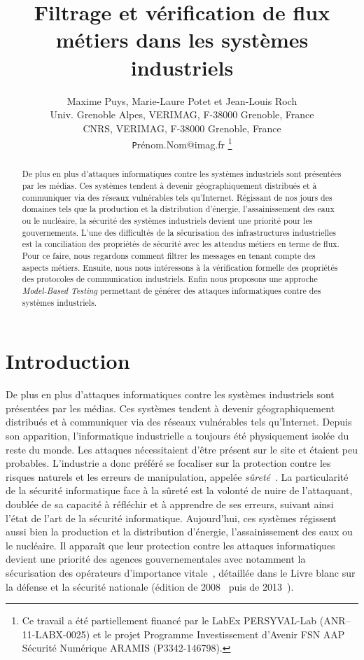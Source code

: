 \documentclass{article}
\title{Filtrage et vérification de flux métiers dans les systèmes industriels}
\author{
    Maxime Puys, Marie-Laure Potet et Jean-Louis Roch\\
    Univ. Grenoble Alpes, VERIMAG, F-38000 Grenoble, France\\
    CNRS, VERIMAG, F-38000 Grenoble, France\\
    {\texttt Prénom.Nom@imag.fr}
    \thanks{Ce travail a été partiellement financé par le LabEx PERSYVAL-Lab
    (ANR–11-LABX-0025) et le projet Programme Investissement d’Avenir FSN AAP
    Sécurité Numérique \no 3 ARAMIS (P3342-146798).}
}
\date{}
\begin{document}
\maketitle

\begin{abstract}
    De plus en plus d’attaques informatiques contre les systèmes industriels
    sont présentées par les médias.
    Ces systèmes tendent à devenir géographiquement distribués et à communiquer
    via des réseaux vulnérables tels qu’Internet.
    Régissant de nos jours des domaines tels que la production et la
    distribution d'énergie, l'assainissement des eaux ou le nucléaire, la
    sécurité des systèmes industriels devient une priorité pour les gouvernements.
    L'une des difficultés de la sécurisation des infrastructures industrielles est
    la conciliation des propriétés de sécurité avec les attendus métiers en
    terme de flux.
    Pour ce faire, nous regardons comment filtrer les messages en tenant compte
    des aspects métiers.
    Ensuite, nous nous intéressons à la vérification formelle des propriétés
    des protocoles de communication industriels.
    Enfin nous proposons une approche {\em Model-Based Testing} permettant de
    générer des attaques informatiques contre des systèmes industriels.
\end{abstract}

\section{Introduction}

De plus en plus d'attaques informatiques contre les systèmes industriels sont
présentées par les médias.
Ces systèmes tendent à devenir géographiquement distribués et à communiquer via
des réseaux vulnérables tels qu'Internet.
Depuis son apparition, l'informatique industrielle a toujours été physiquement
isolée du reste du monde.
Les attaques nécessitaient d'être présent sur le site et étaient peu probables.
L'industrie a donc préféré se focaliser sur la protection contre les risques
naturels et les erreurs de manipulation, appelée {\em sûreté}~\cite{Pie10,PS09,
IAEA96}.
La particularité de la sécurité informatique face à la sûreté est la volonté
de nuire de l'attaquant, doublée de sa capacité à réfléchir et à apprendre de
ses erreurs, suivant ainsi l'état de l'art de la sécurité informatique.
Aujourd'hui, ces systèmes régissent aussi bien la production et la distribution
d'énergie, l'assainissement des eaux ou le nucléaire.
Il apparaît que leur protection contre les attaques informatiques devient une
priorité des agences gouvernementales avec notamment la sécurisation des
opérateurs d'importance vitale~\cite{Leg07_oiv}, détaillée dans le Livre blanc
sur la défense et la sécurité nationale (édition de 2008~\cite{LivreBlanc08}
puis de 2013~\cite{LivreBlanc13}).
\end{document}
